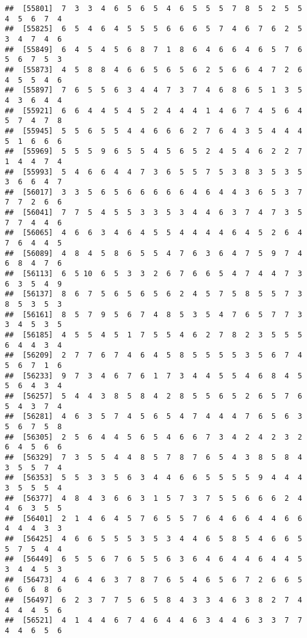\documentclass[
]{book}
\begin{document}
\begin{verbatim}
##  [55801]  7  3  3  4  6  5  6  5  4  6  5  5  5  7  8  5  2  5  5  4  5  6  7  4
##  [55825]  6  5  4  6  4  5  5  5  6  6  6  5  7  4  6  7  6  2  5  3  4  7  4  6
##  [55849]  6  4  5  4  5  6  8  7  1  8  6  4  6  6  4  6  5  7  6  5  6  7  5  3
##  [55873]  4  5  8  8  4  6  6  5  6  5  6  2  5  6  6  4  7  2  6  4  5  5  4  6
##  [55897]  7  6  5  5  6  3  4  4  7  3  7  4  6  8  6  5  1  3  5  4  3  6  4  4
##  [55921]  6  6  4  4  5  4  5  2  4  4  4  1  4  6  7  4  5  6  4  5  7  4  7  8
##  [55945]  5  5  6  5  5  4  4  6  6  6  2  7  6  4  3  5  4  4  4  5  1  6  6  6
##  [55969]  5  5  5  9  6  5  5  4  5  6  5  2  4  5  4  6  2  2  7  1  4  4  7  4
##  [55993]  5  4  6  6  4  4  7  3  6  5  5  7  5  3  8  3  5  3  5  3  6  6  4  7
##  [56017]  3  3  5  6  5  6  6  6  6  6  4  6  4  4  3  6  5  3  7  7  7  2  6  6
##  [56041]  7  7  5  4  5  5  3  3  5  3  4  4  6  3  7  4  7  3  5  7  7  4  4  6
##  [56065]  4  6  6  3  4  6  4  5  5  4  4  4  4  6  4  5  2  6  4  7  6  4  4  5
##  [56089]  4  8  4  5  8  6  5  5  4  7  6  3  6  4  7  5  9  7  4  6  8  4  7  6
##  [56113]  6  5 10  6  5  3  3  2  6  7  6  6  5  4  7  4  4  7  3  6  3  5  4  9
##  [56137]  8  6  7  5  6  5  6  5  6  2  4  5  7  5  8  5  5  7  3  8  5  3  5  3
##  [56161]  8  5  7  9  5  6  7  4  8  5  3  5  4  7  6  5  7  7  3  3  4  5  3  5
##  [56185]  4  5  5  4  5  1  7  5  5  4  6  2  7  8  2  3  5  5  5  6  4  4  3  4
##  [56209]  2  7  7  6  7  4  6  4  5  8  5  5  5  5  3  5  6  7  4  5  6  7  1  6
##  [56233]  9  7  3  4  6  7  6  1  7  3  4  4  5  5  4  6  8  4  5  5  6  4  3  4
##  [56257]  5  4  4  3  8  5  8  4  2  8  5  5  6  5  2  6  5  7  6  5  4  3  7  4
##  [56281]  4  6  3  5  7  4  5  6  5  4  7  4  4  4  7  6  5  6  3  5  6  7  5  8
##  [56305]  2  5  6  4  4  5  6  5  4  6  6  7  3  4  2  4  2  3  2  6  4  5  6  6
##  [56329]  7  3  5  5  4  4  8  5  7  8  7  6  5  4  3  8  5  8  4  3  5  5  7  4
##  [56353]  5  5  3  3  5  6  3  4  4  6  6  5  5  5  5  9  4  4  4  3  5  5  5  4
##  [56377]  4  8  4  3  6  6  3  1  5  7  3  7  5  5  6  6  6  2  4  4  6  3  5  5
##  [56401]  2  1  4  6  4  5  7  6  5  5  7  6  4  6  6  4  4  6  6  4  4  4  3  3
##  [56425]  4  6  6  5  5  5  3  5  3  4  4  6  5  8  5  4  6  6  5  5  7  5  4  4
##  [56449]  6  5  5  6  7  6  5  5  6  3  6  4  6  4  4  6  4  4  5  3  4  4  5  3
##  [56473]  4  6  4  6  3  7  8  7  6  5  4  6  5  6  7  2  6  6  5  6  6  6  8  6
##  [56497]  6  2  3  7  7  5  6  5  8  4  3  3  4  6  3  8  2  7  4  4  4  4  5  6
##  [56521]  4  1  4  4  6  7  4  6  4  4  6  3  4  4  6  3  3  7  7  4  4  6  5  6

\end{verbatim}
\end{document}
